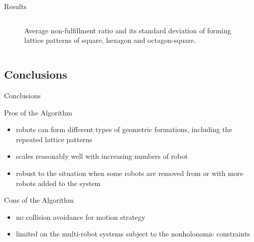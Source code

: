 \documentclass[10pt]{beamer}
\begin{document}
\begin{frame}{Results}{}
\begin{columns}[T]
\begin{column}{.48\textwidth}
\begin{figure}
          \caption{Average non-fulfillment ratio and its standard
            deviation of forming lattice patterns of square, hexagon
            and octagon-square.}
        \end{figure}
      \end{column}%
    \end{columns}
\end{frame}

\subsection{Conclusions}
\begin{frame}{Conclusions}{}
\begin{block}{Pros of the Algorithm}
  \begin{itemize}
  \item robots can form different types of geometric formations,
including the repeated lattice patterns
  \item scales reasonably well with increasing numbers of robot
  \item robust to the situation when some robots are removed from or
with more robots added to the system
  \end{itemize}
\end{block}
\begin{block}{Cons of the Algorithm}
  \begin{itemize}
  \item no collision avoidance for motion strategy
  \item limited on the multi-robot systems subject to the nonholonomic
    constraints
  \end{itemize}
\end{block}
\end{frame}
\end{document}
